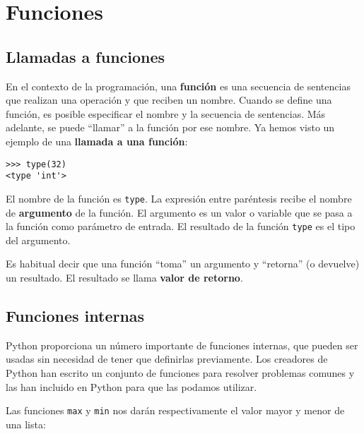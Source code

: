 
\chapter{Funciones}
\label{funcchap}

\section{Llamadas a funciones}
\label{functionchap}

En el contexto de la programación, una {\bf función} es una secuencia de
sentencias que realizan una operación y que reciben un nombre. Cuando se define una función,
es posible especificar el nombre y la secuencia de sentencias. Más adelante, se puede
``llamar'' a la función por ese nombre.
Ya hemos visto un ejemplo de una {\bf llamada a una función}:

\beforeverb
\begin{verbatim}
>>> type(32)
<type 'int'>
\end{verbatim}
\afterverb
%
El nombre de la función es {\tt type}. La expresión entre paréntesis recibe
el nombre de {\bf argumento} de la función. El argumento es
un valor o variable que se pasa a la función como parámetro de entrada.
El resultado de la función {\tt type} es el tipo del argumento.


Es habitual decir que una función ``toma'' un argumento y ``retorna'' (o devuelve)
un resultado. El resultado se llama {\bf valor de retorno}.


\section{Funciones internas}

Python proporciona un número importante de funciones internas, que
pueden ser usadas sin necesidad de tener que definirlas previamente.
Los creadores de Python han escrito un conjunto de funciones
para resolver problemas comunes y las han incluido en Python para que las podamos utilizar.

Las funciones {\tt max} y {\tt min} nos darán respectivamente
el valor mayor y menor de una lista:

